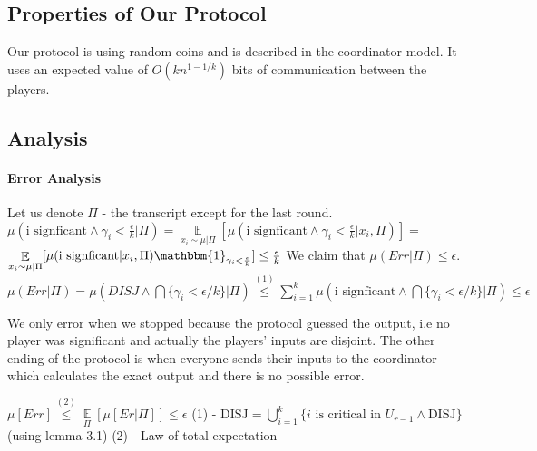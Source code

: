 \documentclass{article}
\theoremstyle{plain}
\begin{document}
\subsection{Properties of Our Protocol}
Our protocol is using random coins and is described in the coordinator model. It uses an expected value of $O(kn^{1-1/k})$ bits of communication between the players.
\subsection{Analysis}
\paragraph{Error Analysis}
Let us denote $\Pi$ - the transcript except for the last round.
$\mu(\text{i signficant} \land \gamma_i < \frac{\epsilon}{k}|\Pi) = \underset{x_i \sim \mu|\Pi}{\mathop{\mathbb{E}}}[\mu(\text{i signficant} \land \gamma_i < \frac{\epsilon}{k} | x_i, \Pi)] =$
$\underset{x_i \sim \mu|\Pi}{\mathop{\mathbb{E}}}[\mu(\text{i signficant} | x_i, \Pi) \mathbbm{1}_{\gamma_i < \frac{\epsilon}{k}}]
\leq \frac{\epsilon}{k}$
We claim that $\mu(Err | \Pi) \leq \epsilon$. \newline
$\mu(Err | \Pi) = \mu(DISJ \land \bigcap \{ \gamma_i < \epsilon / k\} | \Pi) \overset{(1)}{\leq} \sum\limits_{i=1}^k \mu(\text{i signficant} \land \bigcap \{ \gamma_i < \epsilon / k\} | \Pi) \leq \epsilon $\newline

We only error when we stopped because the protocol guessed the output, i.e no player was significant and actually the players' inputs are disjoint. The other ending of the protocol is when everyone sends their inputs to the coordinator which calculates the exact output and there is no possible error. \newline

$ \mu[Err] \overset{(2)}{\leq} \underset{\Pi}{\mathop{\mathbb{E}}} [\mu[Er | \Pi] ] \leq \epsilon $ \newline
(1) - $  \text{DISJ} = \bigcup_{i=1}^{k}\{\text{$i$ is critical in $U_{r-1}$} \land \text{DISJ} \} $ (using lemma 3.1) \newline
(2) - Law of total expectation
\end{document}

